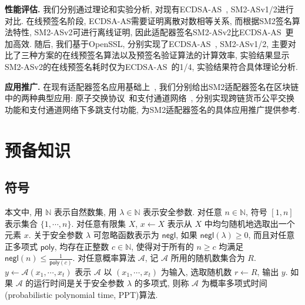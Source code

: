 \documentclass[review]{jcr}
\begin{document}
\begin{trivlist}
\item \textbf{性能评估.} 我们分别通过理论和实验分析, 对现有ECDSA-AS~\cite{PA18,AumayrEEFHMMR20}, SM2-ASv1/2进行对比. 在线预签名阶段, ECDSA-AS需要证明离散对数相等关系, 
而根据SM2签名算法特性, SM2-ASv2可进行离线证明, 因此适配器签名SM2-ASv2比ECDSA-AS~\cite{PA18,AumayrEEFHMMR20}更加高效. 随后, 我们基于OpenSSL, 分别实现了ECDSA-AS~\cite{AumayrEEFHMMR20}, SM2-ASv1/2, 主要对比了三种方案的在线预签名算法以及预签名验证算法的计算效率, 实验结果显示SM2-ASv2的在线预签名耗时仅为ECDSA-AS~\cite{AumayrEEFHMMR20}的1/4, 实验结果符合具体理论分析.
\end{trivlist}

\begin{trivlist}
\item \textbf{应用推广.} 
在现有适配器签名应用基础上~\cite{Poelstra2017,MalavoltaMSKM19,EsginEE20,AumayrEEFHMMR20}, 我们分别给出SM2适配器签名在区块链中的两种典型应用: 原子交换协议~\cite{Nolan2013,Poelstra2017,DeshpandeH20,Gugger20}和支付通道网络~\cite{DeckerW15,PC2018,AumayrEEFHMMR20}, 分别实现跨链货币公平交换功能和支付通道网络下多跳支付功能, 为SM2适配器签名的具体应用推广提供参考. 
\end{trivlist}

\section{预备知识} 

\subsection{符号}

本文中, 用 $\mathbb{N}$ 表示自然数集, 用 $\lambda\in \mathbb{N}$ 表示安全参数. 对任意 $n \in \mathbb{N}$, 符号 $[1,n]$ 表示集合 $\{1,\cdots,n\}$. 对任意有限集 $X$, $x \leftarrow X$ 表示从 $X$ 中均匀随机地选取出一个元素 $x$. 
关于安全参数 $\lambda$ 可忽略函数表示为 $\mathsf{negl}$, 如果 $\mathsf{negl}(\lambda) \geq 0$, 而且对任意正多项式 $\mathsf{poly}$, 均存在正整数 $c \in \mathbb{N}$, 使得对于所有的 $n \geq c$ 均满足 $\mathsf{negl}(n) \leq \frac{1}{\mathsf{poly}(c)}$.  
对任意概率算法 $\mathcal{A}$, 记 $\mathcal{A}$ 所用的随机数集合为 $R$. $y \leftarrow \mathcal{A}(x_1,\cdots,x_t)$ 表示 $\mathcal{A}$ 以 $(x_1, \cdots, x_t)$ 为输入, 选取随机数 $r \leftarrow R$, 输出 $y$. 如果 $\mathcal{A}$ 的运行时间是关于安全参数 $\lambda$ 的多项式, 则称 $\mathcal{A}$ 为概率多项式时间(probabilistic polynomial time, PPT)算法. 
\end{document}
